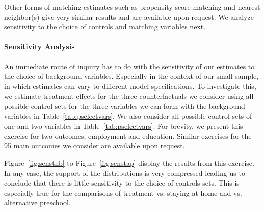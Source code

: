 \noindent Other forms of matching estimates such as propensity score matching and nearest neighbor(s) give very similar results and are available upon request. We analyze sensitivity to the choice of controls and matching variables next.

\paragraph{Sensitivity Analysis} \label{app:senscontrols}

\noindent An immediate route of inquiry has to do with the sensitivity of our estimates to the choice of background variables. Especially in the context of our small sample, in which estimates can vary to different model specifications. To investigate this, we estimate treatment effects for the three counterfactuals we consider using all possible control sets for the three variables we can form with the background variables in Table~\ref{tab:pselectvars}. We also consider all possible control sets of one and two variables in Table~\ref{tab:pselectvars}. For brevity, we present this exercise for two outcomes, employment and education. Similar exercises for the 95 main outcomes we consider are available upon request.

\noindent Figure~\ref{fig:senstnb} to Figure~\ref{fig:senstap} display the results from this exercise. In any case, the support of the distributions is very compressed leading us to conclude that there is little sensitivity to the choice of controls sets. This is especially true for the comparisons of treatment vs. staying at home and vs. alternative preschool.

